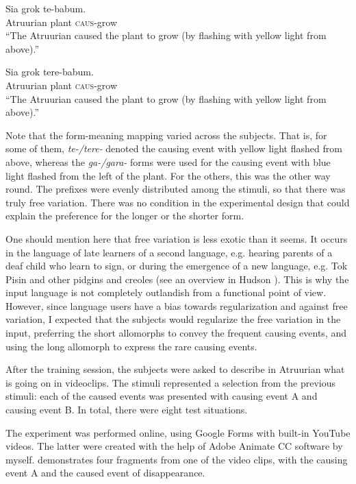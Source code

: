 \documentclass[output=paper]{langsci/langscibook}
\begin{document}
\ea
\ea
\gll  Sia    grok  te-babum.\\
       Atruurian   plant   \textsc{caus}{}-grow\\
\glt “The Atruurian caused the plant to grow (by flashing with yellow light from above).”

\ex
\gll  Sia    grok  tere-babum.\\
       Atruurian   plant   \textsc{caus}{}-grow\\
\glt “The Atruurian caused the plant to grow (by flashing with yellow light from above).”
\z
\z

Note that the form-meaning mapping varied across the subjects. That is, for some of them, \textit{te-/tere-} denoted the causing event with yellow light flashed from above, whereas the \textit{ga-/gara-} forms were used for the causing event with blue light flashed from the left of the plant. For the others, this was the other way round. The prefixes were evenly distributed among the stimuli, so that there was truly free variation. There was no condition in the experimental design that could explain the preference for the longer or the shorter form.  

One should mention here that free variation is less exotic than it seems. It occurs in the language of late learners of a second language, e.g. hearing parents of a deaf child who learn to sign, or during the emergence of a new language, e.g. Tok Pisin and other pidgins and creoles (see an overview in Hudson \citealt{KamNewport2009}). This is why the input language is not completely outlandish from a functional point of view. However, since language users have a bias towards regularization and against free variation, I expected that the subjects would regularize the free variation in the input, preferring the short allomorphs to convey the frequent causing events, and using the long allomorph to express the rare causing events.

After the training session, the subjects were asked to describe in Atruurian what is going on in videoclips. The stimuli represented a selection from the previous stimuli: each of the caused events was presented with causing event A and causing event B. In total, there were eight test situations. 

The experiment was performed online, using Google Forms with built-in YouTube videos. The latter were created with the help of Adobe Animate CC software by myself.  demonstrates four fragments from one of the video clips, with the causing event A and the caused event of disappearance.
\end{document}
